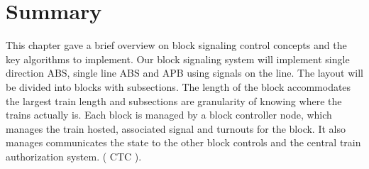 \begin{center}
\end{center}

\section{Summary}

This chapter gave a brief overview on block signaling control concepts and the key algorithms to implement. Our block signaling system will implement single direction ABS, single line ABS and APB using signals on the line. The layout will be divided into blocks with subsections. The length of the block accommodates the largest train length and subsections are granularity of knowing where the trains actually is. Each block is managed by a block controller node, which manages the train hosted, associated signal and turnouts for the block. It also manages communicates the state to the other block controls and the central train authorization system. ( CTC ).

